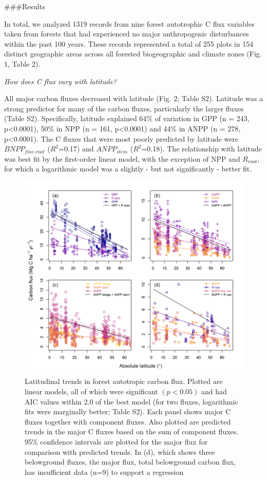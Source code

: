 \documentclass[
]{article}
\begin{document}
\#\#\#Results

In total, we analyzed 1319 records from nine forest autotrophic C flux
variables taken from forests that had experienced no major anthropogenic
disturbances within the past 100 years. These records represented a
total of 255 plots in 154 distinct geographic areas across all forested
biogeographic and climate zones (Fig. 1, Table 2).

\emph{How does C flux vary with latitude?}

All major carbon fluxes decreased with latitude (Fig. 2; Table S2).
Latitude was a strong predictor for many of the carbon fluxes,
particularly the larger fluxes (Table S2). Specifically, latitude
explained 64\% of variation in GPP (n = 243, p\textless0.0001), 50\% in
NPP (n = 161, p\textless0.0001) and 44\% in ANPP (n = 278,
p\textless0.0001). The C fluxes that were most poorly predicted by
latitude were \(BNPP_{fine.root}\) (\(R^2\)=0.17) and \(ANPP_{stem}\)
(\(R^2\)=0.18). The relationship with latitude was best fit by the
first-order linear model, with the exception of NPP and \(R_{root}\),
for which a logarithmic model was a slightly - but not significantly -
better fit.

\begin{figure}[H]
\includegraphics[width=1\linewidth]{combined_stacked} \caption{Latitudinal trends in forest autotropic carbon flux. Plotted are linear models, all of which were significant $(p<0.05)$ and had AIC values within 2.0 of the best model (for two fluxes, logarithmic fits were marginally better; Table S2). Each panel shows major C fluxes together with component fluxes. Also plotted are predicted trends in the major C fluxes based on the sum of component fluxes. 95\% confidence intervals are plotted for the major flux for comparison with predicted trends. In (d), which shows three belowground fluxes, the major flux, total belowground carbon flux, has insufficient data (n=9) to support a regression}\label{fig:unnamed-chunk-7}
\end{figure}
\end{document}
